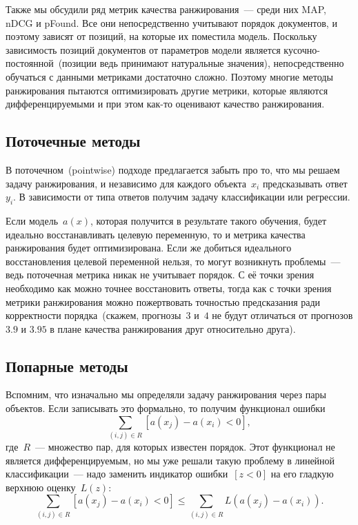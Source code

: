 \documentclass[12pt,fleqn]{article}
\begin{document}
Также мы обсудили ряд метрик качества ранжирования~--- среди них MAP, nDCG и pFound.
Все они непосредственно учитывают порядок документов, и поэтому зависят от позиций, на которые
их поместила модель.
Поскольку зависимость позиций документов от параметров модели является кусочно-постоянной~(позиции ведь
принимают натуральные значения),
непосредственно обучаться с данными метриками достаточно сложно.
Поэтому многие методы ранжирования пытаются оптимизировать другие метрики,
которые являются дифференцируемыми и при этом как-то оценивают качество ранжирования.

\subsection{Поточечные методы}

В поточечном~(pointwise) подходе предлагается забыть про то, что мы решаем задачу ранжирования,
и независимо для каждого объекта~$x_i$ предсказывать ответ~$y_i$.
В зависимости от типа ответов получим задачу классификации или регрессии.

Если модель~$a(x)$, которая получится в результате такого обучения, будет идеально
восстанавливать целевую переменную, то и метрика качества ранжирования будет оптимизирована.
Если же добиться идеального восстановления целевой переменной нельзя,
то могут возникнуть проблемы~--- ведь поточечная метрика никак не учитывает порядок.
С её точки зрения необходимо как можно точнее восстановить ответы,
тогда как с точки зрения метрики ранжирования можно пожертвовать точностью предсказания
ради корректности порядка~(скажем, прогнозы~$3$ и~$4$ не будут отличаться от прогнозов
$3.9$ и $3.95$ в плане качества ранжирования друг относительно друга).

\subsection{Попарные методы}

Вспомним, что изначально мы определяли задачу ранжирования через пары объектов.
Если записывать это формально, то получим функционал ошибки
\[
    \sum_{(i, j) \in R}
        [a(x_j) - a(x_i) < 0],
\]
где~$R$~--- множество пар, для которых известен порядок.
Этот функционал не является дифференцируемым, но мы уже решали такую проблему в линейной классификации~---
надо заменить индикатор ошибки~$[z < 0]$ на его гладкую верхнюю оценку~$L(z)$:
\[
    \sum_{(i, j) \in R}
        [a(x_j) - a(x_i) < 0]
    \leq
    \sum_{(i, j) \in R}
        L\left(
            a(x_j) - a(x_i)
        \right).
\]
\end{document}
